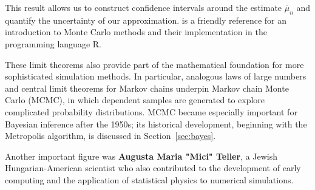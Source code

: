 This result allows us to construct confidence intervals around the estimate $\overline{\mu}_n$ and quantify the uncertainty of our approximation.
\cite{robert2010introducing} is a friendly reference for an introduction to Monte Carlo methods and their implementation in the programming language R. 

These limit theorems also provide part of the mathematical foundation for more sophisticated simulation methods. In particular, analogous laws of large numbers and central limit theorems for Markov chains underpin Markov chain Monte Carlo (MCMC), in which dependent samples are generated to explore complicated probability distributions. MCMC became especially important for Bayesian inference after the 1950s; its historical development, beginning with the Metropolis algorithm, is discussed in Section~\ref{sec:bayes}.



Another important figure was \textbf{Augusta Maria "Mici" Teller}, a Jewish Hungarian-American scientist who also contributed to the development of early computing and the application of statistical physics to numerical simulations.


\vspace{-1em}

